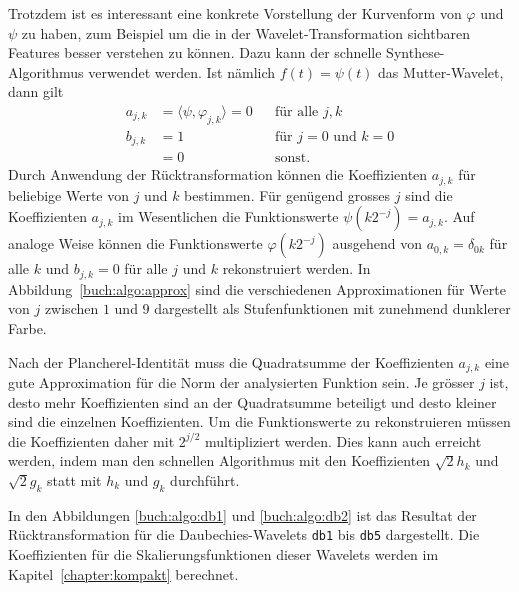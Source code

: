 Trotzdem ist es interessant eine konkrete Vorstellung der Kurvenform
von $\varphi$ und $\psi$ zu haben, zum Beispiel um die in der
Wavelet-Transformation sichtbaren Features besser verstehen
zu können.
Dazu kann der schnelle Synthese-Algorithmus verwendet werden.
Ist nämlich $f(t)=\psi(t)$ das Mutter-Wavelet, dann gilt
\[
\begin{aligned}
a_{j,k}
&=
\langle \psi, \varphi_{j,k}\rangle = 0 
& &\text{für alle $j,k$}
\\
b_{j,k}
&=1&&\text{für $j=0$ und $k=0$}
\\
&=0&&\text{sonst.}
\end{aligned}
\]
Durch Anwendung der Rücktransformation können die Koeffizienten 
$a_{j,k}$ für beliebige Werte von $j$ und $k$ bestimmen.
Für genügend grosses $j$ sind die Koeffizienten $a_{j,k}$ im Wesentlichen
die Funktionswerte $\psi(k2^{-j}) = a_{j,k}$.
Auf analoge Weise können die Funktionswerte $\varphi(k2^{-j})$
ausgehend von $a_{0,k}=\delta_{0k}$ für alle $k$
und $b_{j,k}=0$ für alle $j$ und $k$ rekonstruiert werden.
In Abbildung~\ref{buch:algo:approx} sind die verschiedenen Approximationen
für Werte von $j$ zwischen $1$ und $9$ dargestellt als Stufenfunktionen
mit zunehmend dunklerer Farbe.

Nach der Plancherel-Identität muss die Quadratsumme der Koeffizienten
$a_{j,k}$ eine gute Approximation für die Norm der analysierten Funktion
sein.
Je grösser $j$ ist, desto mehr Koeffizienten sind an der Quadratsumme
beteiligt und desto kleiner sind die einzelnen Koeffizienten.
Um die Funktionswerte zu rekonstruieren müssen die Koeffizienten
daher mit $2^{j/2}$ multipliziert werden.
Dies kann auch erreicht werden, indem man den schnellen Algorithmus
mit den Koeffizienten $\sqrt{2} h_k$ und
$\sqrt{2} g_k$ statt mit $h_k$ und $g_k$ durchführt.

In den Abbildungen \ref{buch:algo:db1} und \ref{buch:algo:db2}
ist das Resultat der Rücktransformation für die Daubechies-Wavelets
\texttt{db1} bis \texttt{db5} dargestellt.
Die Koeffizienten für die Skalierungsfunktionen dieser Wavelets werden
im Kapitel~\ref{chapter:kompakt} berechnet.

